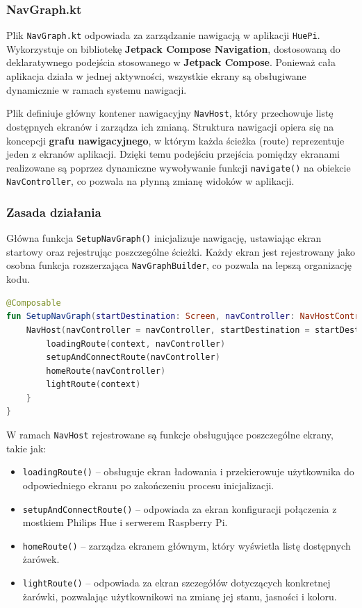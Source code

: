 \documentclass[12pt]{article}
\begin{document}
\subsubsection{NavGraph.kt}
Plik \texttt{NavGraph.kt} odpowiada za zarządzanie nawigacją w aplikacji \texttt{HuePi}. Wykorzystuje on bibliotekę \textbf{Jetpack Compose Navigation}, dostosowaną do deklaratywnego
podejścia stosowanego w \textbf{Jetpack Compose}. Ponieważ cała aplikacja działa w jednej aktywności, wszystkie ekrany są obsługiwane dynamicznie w ramach systemu nawigacji.

Plik definiuje główny kontener nawigacyjny \texttt{NavHost}, który przechowuje listę dostępnych ekranów i zarządza ich zmianą. Struktura nawigacji opiera się na koncepcji
\textbf{grafu nawigacyjnego}, w którym każda ścieżka (route) reprezentuje jeden z ekranów aplikacji. Dzięki temu podejściu przejścia pomiędzy ekranami realizowane są poprzez
dynamiczne wywoływanie funkcji \texttt{navigate()} na obiekcie \texttt{NavController}, co pozwala na płynną zmianę widoków w aplikacji.

\subsubsection*{Zasada działania}
Główna funkcja \texttt{SetupNavGraph()} inicjalizuje nawigację, ustawiając ekran startowy oraz rejestrując poszczególne ścieżki. Każdy ekran jest rejestrowany jako osobna
funkcja rozszerzająca \texttt{NavGraphBuilder}, co pozwala na lepszą organizację kodu.

\begin{lstlisting}[language=Kotlin]
@Composable
fun SetupNavGraph(startDestination: Screen, navController: NavHostController, context: Application) {
    NavHost(navController = navController, startDestination = startDestination) {
        loadingRoute(context, navController)
        setupAndConnectRoute(navController)
        homeRoute(navController)
        lightRoute(context)
    }
}
\end{lstlisting}

W ramach \texttt{NavHost} rejestrowane są funkcje obsługujące poszczególne ekrany, takie jak:
\begin{itemize}
    \item \texttt{loadingRoute()} – obsługuje ekran ładowania i przekierowuje użytkownika do odpowiedniego ekranu po zakończeniu procesu inicjalizacji.
    \item \texttt{setupAndConnectRoute()} – odpowiada za ekran konfiguracji połączenia z mostkiem Philips Hue i serwerem Raspberry Pi.
    \item \texttt{homeRoute()} – zarządza ekranem głównym, który wyświetla listę dostępnych żarówek.
    \item \texttt{lightRoute()} – odpowiada za ekran szczegółów dotyczących konkretnej żarówki, pozwalając użytkownikowi na zmianę jej stanu, jasności i koloru.    
\end{itemize}
\end{document}
